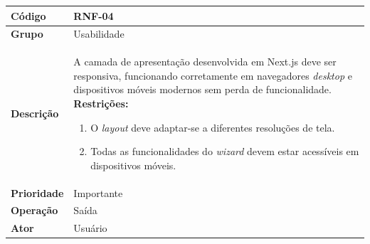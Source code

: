 \FloatBarrier
\begin{quadro}[htb]
  \caption{RNF-04 -- Interface responsiva}
  \label{quad:rnf04}
  \begin{tabular}{|p{3.2cm}|p{11.8cm}|}
    \hline
    \textbf{Código}     & RNF-04                                                                      \\ \hline
    \textbf{Grupo}      & Usabilidade                                                                 \\ \hline
    \textbf{Descrição}  &
    A camada de apresentação desenvolvida em Next.js deve ser responsiva, funcionando corretamente em navegadores \textit{desktop} e dispositivos móveis modernos sem perda de funcionalidade.
    \textbf{Restrições:}
    \begin{enumerate}[nosep,leftmargin=1.2em,topsep=2pt,partopsep=0pt,parsep=0pt,itemsep=1pt]
      \item O \textit{layout} deve adaptar-se a diferentes resoluções de tela.
      \item Todas as funcionalidades do \textit{wizard} devem estar acessíveis em dispositivos móveis.
    \end{enumerate} \\ \hline
    \textbf{Prioridade} & Importante                                                                  \\ \hline
    \textbf{Operação}   & Saída                                                                       \\ \hline
    \textbf{Ator}       & Usuário                                                                     \\ \hline
  \end{tabular}
\end{quadro}

